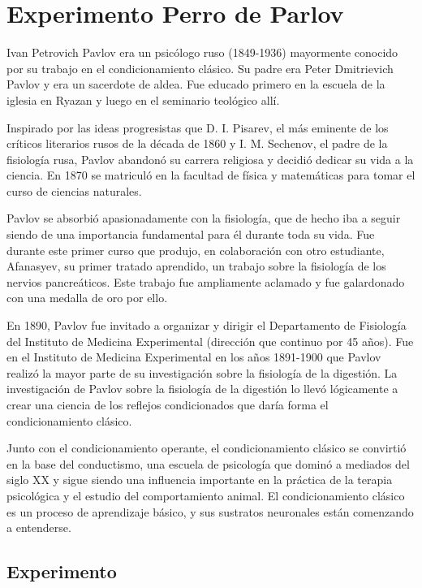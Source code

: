 \documentclass[letterpaper, 10pt, journal]{IEEEtran}
\begin{document}
\section{Experimento Perro de Parlov}
Ivan Petrovich Pavlov era un psicólogo ruso (1849-1936) mayormente conocido por su trabajo en el condicionamiento clásico. Su padre era Peter Dmitrievich Pavlov y era un sacerdote de aldea. Fue educado primero en la escuela de la iglesia en Ryazan y luego en el seminario teológico allí.

Inspirado por las ideas progresistas que D. I. Pisarev, el más eminente de los críticos literarios rusos de la década de 1860 y I. M. Sechenov, el padre de la fisiología rusa, Pavlov abandonó su carrera religiosa y decidió dedicar su vida a la ciencia. En 1870 se matriculó en la facultad de física y matemáticas para tomar el curso de ciencias naturales.

Pavlov se absorbió apasionadamente con la fisiología, que de hecho iba a seguir siendo de una importancia fundamental para él durante toda su vida. Fue durante este primer curso que produjo, en colaboración con otro estudiante, Afanasyev, su primer tratado aprendido, un trabajo sobre la fisiología de los nervios pancreáticos. Este trabajo fue ampliamente aclamado y fue galardonado con una medalla de oro por ello.

En 1890, Pavlov fue invitado a organizar y dirigir el Departamento de Fisiología del Instituto de Medicina Experimental (dirección que continuo por 45 años). Fue en el Instituto de Medicina Experimental en los años 1891-1900 que Pavlov realizó la mayor parte de su investigación sobre la fisiología de la digestión. 
La investigación de Pavlov sobre la fisiología de la digestión lo llevó lógicamente a crear una ciencia de los reflejos condicionados que daría forma el condicionamiento clásico. 

Junto con el condicionamiento operante, el condicionamiento clásico se convirtió en la base del conductismo, una escuela de psicología que dominó a mediados del siglo XX y sigue siendo una influencia importante en la práctica de la terapia psicológica y el estudio del comportamiento animal. El condicionamiento clásico es un proceso de aprendizaje básico, y sus sustratos neuronales están comenzando a entenderse.

\subsection{Experimento}
\end{document}
